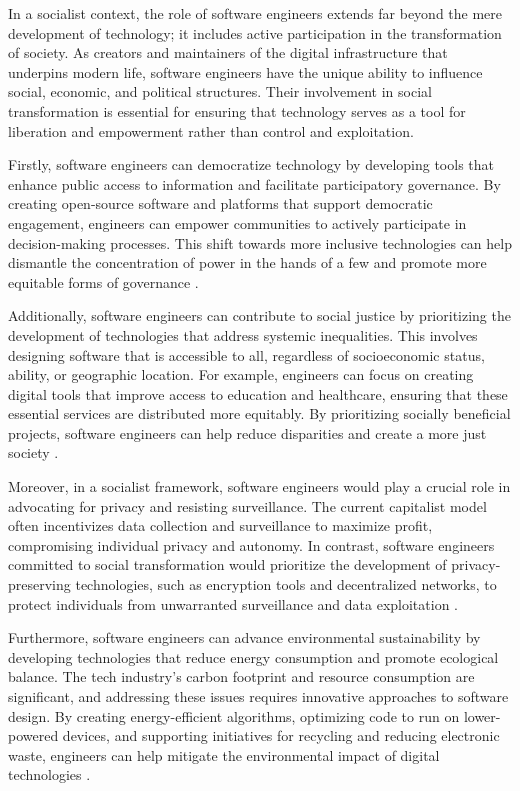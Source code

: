 \begin{refsection}
In a socialist context, the role of software engineers extends far beyond the mere development of technology; it includes active participation in the transformation of society. As creators and maintainers of the digital infrastructure that underpins modern life, software engineers have the unique ability to influence social, economic, and political structures. Their involvement in social transformation is essential for ensuring that technology serves as a tool for liberation and empowerment rather than control and exploitation.

Firstly, software engineers can democratize technology by developing tools that enhance public access to information and facilitate participatory governance. By creating open-source software and platforms that support democratic engagement, engineers can empower communities to actively participate in decision-making processes. This shift towards more inclusive technologies can help dismantle the concentration of power in the hands of a few and promote more equitable forms of governance \cite[pp.~125-130]{colemanCoding2012}.

Additionally, software engineers can contribute to social justice by prioritizing the development of technologies that address systemic inequalities. This involves designing software that is accessible to all, regardless of socioeconomic status, ability, or geographic location. For example, engineers can focus on creating digital tools that improve access to education and healthcare, ensuring that these essential services are distributed more equitably. By prioritizing socially beneficial projects, software engineers can help reduce disparities and create a more just society \cite[pp.~70-74]{benklerWealth2010}.

Moreover, in a socialist framework, software engineers would play a crucial role in advocating for privacy and resisting surveillance. The current capitalist model often incentivizes data collection and surveillance to maximize profit, compromising individual privacy and autonomy. In contrast, software engineers committed to social transformation would prioritize the development of privacy-preserving technologies, such as encryption tools and decentralized networks, to protect individuals from unwarranted surveillance and data exploitation \cite[pp.~330-335]{zuboffSurveillance2020}.

Furthermore, software engineers can advance environmental sustainability by developing technologies that reduce energy consumption and promote ecological balance. The tech industry’s carbon footprint and resource consumption are significant, and addressing these issues requires innovative approaches to software design. By creating energy-efficient algorithms, optimizing code to run on lower-powered devices, and supporting initiatives for recycling and reducing electronic waste, engineers can help mitigate the environmental impact of digital technologies \cite[pp.~100-105]{jacksonProsperity2016}.


\end{refsection}

